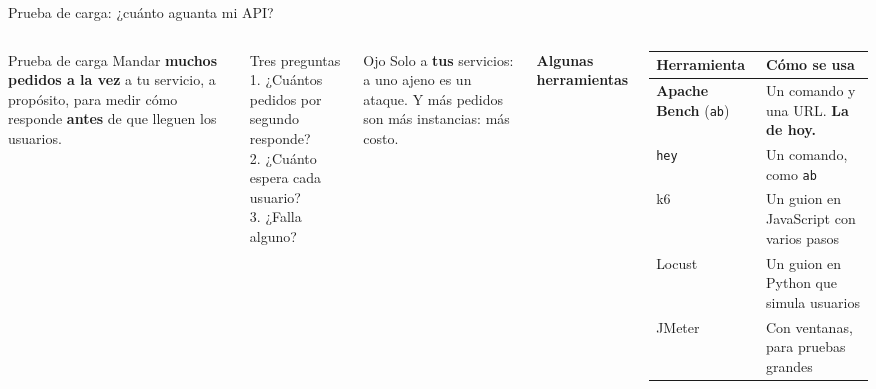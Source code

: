 \documentclass[aspectratio=169,10pt,c]{beamer}
\begin{document}
\begin{frame}{Prueba de carga: ¿cuánto aguanta mi API?}
\begin{columns}[T,onlytextwidth]
\begin{block}{Prueba de carga}
\small Mandar \textbf{muchos pedidos a la vez} a tu servicio, a propósito, para medir cómo responde \textbf{antes} de que lleguen los usuarios.
\end{block}
\begin{exampleblock}{Tres preguntas}
\small
1. ¿Cuántos pedidos por segundo responde?\\
2. ¿Cuánto espera cada usuario?\\
3. ¿Falla alguno?
\end{exampleblock}
\begin{alertblock}{Ojo}
\small Solo a \textbf{tus} servicios: a uno ajeno es un ataque. Y más pedidos son más instancias: más costo.
\end{alertblock}
\renewcommand{\arraystretch}{1.2}
\textbf{\small Algunas herramientas}\par\smallskip
\small
\begin{tabular}{@{}>{\raggedright\arraybackslash}p{2.2cm}>{\raggedright\arraybackslash}p{4.6cm}@{}}
\toprule
\textbf{Herramienta} & \textbf{Cómo se usa}\\
\midrule
\textbf{Apache Bench} (\texttt{ab}) & Un comando y una URL. \textbf{La de hoy.}\\
\texttt{hey} & Un comando, como \texttt{ab}\\
k6 & Un guion en JavaScript con varios pasos\\
Locust & Un guion en Python que simula usuarios\\
JMeter & Con ventanas, para pruebas grandes\\
\bottomrule
\end{tabular}
\end{columns}
\end{frame}
\end{document}
